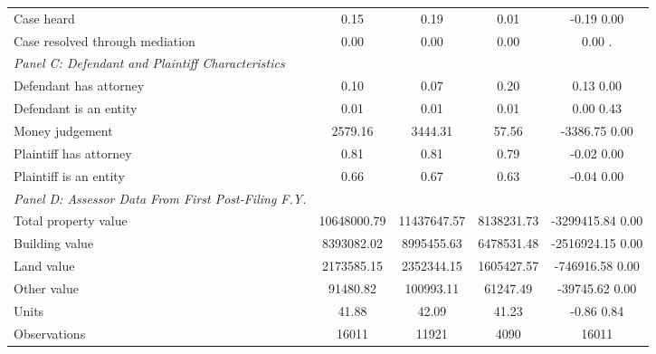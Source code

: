 \begin{table}[htbp]
\begin{tabular}{l*{4}{c}}
\hspace{0.25cm}Case heard&      0.15  &      0.19  &      0.01  &  -0.19 0.00\\
\hspace{0.25cm}Case resolved through mediation&      0.00  &      0.00  &      0.00  &      0.00 .\\
\emph{Panel C: Defendant and Plaintiff Characteristics}&            &            &            &            \\
\hspace{0.25cm}Defendant has attorney&      0.10  &      0.07  &      0.20  &   0.13 0.00\\
\hspace{0.25cm}Defendant is an entity&      0.01  &      0.01  &      0.01  &   0.00 0.43\\
\hspace{0.25cm}Money judgement&   2579.16  &   3444.31  &     57.56  & -3386.75 0.00\\
\hspace{0.25cm}Plaintiff has attorney&      0.81  &      0.81  &      0.79  &  -0.02 0.00\\
\hspace{0.25cm}Plaintiff is an entity&      0.66  &      0.67  &      0.63  &  -0.04 0.00\\
\emph{Panel D: Assessor Data From First Post-Filing F.Y.}&            &            &            &            \\
\hspace{0.25cm}Total property value&10648000.79  &11437647.57  &8138231.73  & -3299415.84 0.00\\
\hspace{0.25cm}Building value&8393082.02  &8995455.63  &6478531.48  & -2516924.15 0.00\\
\hspace{0.25cm}Land value&2173585.15  &2352344.15  &1605427.57  & -746916.58 0.00\\
\hspace{0.25cm}Other value&  91480.82  & 100993.11  &  61247.49  & -39745.62 0.00\\
\hspace{0.25cm}Units&     41.88  &     42.09  &     41.23  &  -0.86 0.84\\
\midrule
Observations        &       16011&       11921&        4090&       16011\\
\bottomrule
\end{tabular}
\end{table}
